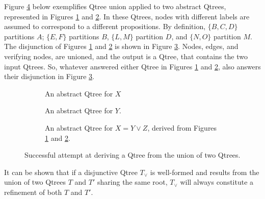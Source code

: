 Figure \ref{fig2:qtree-x-y-z-disj-wellformed} below exemplifies Qtree union applied to two abstract Qtrees, represented in Figures \ref{fig2:qtree-y} and \ref{fig2:qtree-z}. In these Qtrees, nodes with different labels are assumed to correspond to a different propositions. By definition, $\lbrace B, C, D \rbrace$ partitions $A$; $\lbrace E, F \rbrace$ partitions $B$, $\lbrace L, M \rbrace$ partition $D$, and $\lbrace N, O \rbrace$ partition $M$. The disjunction of Figures \ref{fig2:qtree-y} and \ref{fig2:qtree-z} is shown in Figure \ref{fig2:qtree-x-disj-wellformed}. Nodes, edges, and  verifying nodes, are unioned, and the output is a Qtree, that contains the two input Qtrees. So, whatever answered either Qtree in Figures \ref{fig2:qtree-y} and \ref{fig2:qtree-z}, also answers their disjunction in Figure \ref{fig2:qtree-x-disj-wellformed}. 

\begin{figure}[H]
	\centering
	\begin{subfigure}[t]{.3\linewidth}
		\centering
		\scalebox{.7}{
			\begin{forest}
				[A[\fbox{B}[\fbox{E}][\fbox{F}]][C][\fbox{D}]]
		\end{forest}}
		\caption{An abstract Qtree for $X$}\label{fig2:qtree-y}
	\end{subfigure}
	\hfill
	\begin{subfigure}[t]{.3\linewidth}
		\centering{}
		\caption{An abstract Qtree for $Y$.}\label{fig2:qtree-z}
	\end{subfigure}
	\hfill
	\begin{subfigure}[t]{.3\linewidth}
		\centering{}
		\caption{An abstract Qtree for $X = Y \vee Z$, derived from Figures \ref{fig2:qtree-y} and \ref{fig2:qtree-z}.}\label{fig2:qtree-x-disj-wellformed}
	\end{subfigure}
	\caption{Successful attempt at deriving a Qtree from the union of two Qtrees.}\label{fig2:qtree-x-y-z-disj-wellformed}
\end{figure}

It can be shown that if a disjunctive Qtree $T_{\vee}$ is well-formed and results from the union of two Qtrees $T$ and $T'$ sharing the same root, $T_{\vee}$ will always constitute a refinement of both $T$ and $T'$.

